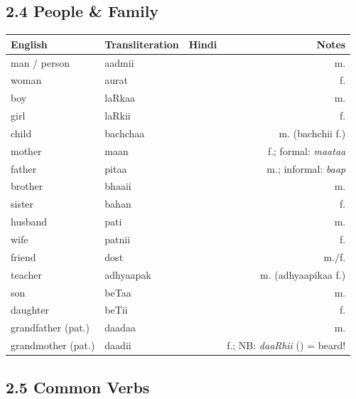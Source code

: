 \subsection{2.4 People \& Family}

\begin{tabular}{@{}VTDN@{}}
  \toprule
  English & Transliteration & Hindi & Notes \\
  \midrule
  man / person & aadmii  &    & m. \\
  woman        & aurat   &     & f. \\
  boy          & laRkaa &   & m. \\
  girl         & laRkii &   & f. \\
  child        & bachchaa &   & m. (bachchii f.) \\
  mother       & maan     &     & f.; formal: \textit{maataa} \\
  father       & pitaa   &    & m.; informal: \textit{baap} \\
  brother      & bhaaii  &     & m. \\
  sister       & bahan   &     & f. \\
  husband      & pati    &     & m. \\
  wife         & patnii   &  & f. \\
  friend       & dost    &   & m./f. \\
  teacher            & adhyaapak &  & m. (adhyaapikaa f.) \\
  son                & beTaa     &     & m. \\
  daughter           & beTii     &     & f. \\
  grandfather (pat.) & daadaa    &     & m. \\
  grandmother (pat.) & daadii    &     & f.; NB: \textit{daaRhii} () = beard! \\
  \bottomrule
\end{tabular}

\subsection{2.5 Common Verbs}


